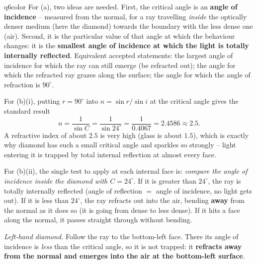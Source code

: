 \documentclass[11pt,a4paper]{article}
\begin{document}
\begin{ansbox}{q6color}
For (a), two ideas are needed. First, the critical angle is an \textbf{angle of incidence} -- measured from the normal, for a ray travelling \emph{inside} the optically denser medium (here the diamond) towards the boundary with the less dense one (air). Second, it is the particular value of that angle at which the behaviour changes: it is the \textbf{smallest angle of incidence at which the light is totally internally reflected}. Equivalent accepted statements: the largest angle of incidence for which the ray can still emerge (be refracted out); the angle for which the refracted ray grazes along the surface; the angle for which the angle of refraction is $90^{\circ}$.

For (b)(i), putting $r = 90^{\circ}$ into $n = \sin r / \sin i$ at the critical angle gives the standard result
\[ n = \frac{1}{\sin C} = \frac{1}{\sin 24^{\circ}} = \frac{1}{0.4067} = 2.4586 \approx 2.5. \]
A refractive index of about $2.5$ is very high (glass is about $1.5$), which is exactly why diamond has such a small critical angle and sparkles so strongly -- light entering it is trapped by total internal reflection at almost every face.

For (b)(ii), the single test to apply at each internal face is: \emph{compare the angle of incidence inside the diamond with $C = 24^{\circ}$}. If it is greater than $24^{\circ}$, the ray is totally internally reflected (angle of reflection $=$ angle of incidence, no light gets out). If it is less than $24^{\circ}$, the ray refracts out into the air, bending \textbf{away} from the normal as it does so (it is going from dense to less dense). If it hits a face along the normal, it passes straight through without bending.

\emph{Left-hand diamond.} Follow the ray to the bottom-left face. There its angle of incidence is \emph{less} than the critical angle, so it is not trapped: it \textbf{refracts away from the normal and emerges into the air at the bottom-left surface}.


\end{ansbox}
\end{document}
